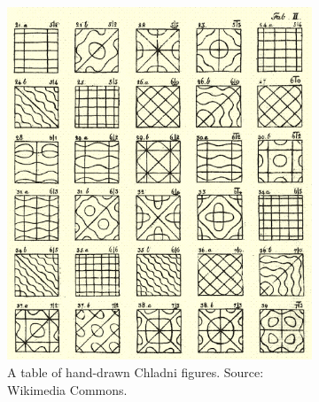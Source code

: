\documentclass[11pt]{article}
\begin{document}
\begin{figure}
\centering
	\begin{subfigure}[h]{0.4\textwidth}
		\centering
		\includegraphics[width=\textwidth]{Figures/chladni_drawing.png}
		\caption{A table of hand-drawn Chladni figures. Source: Wikimedia Commons.}
		\label{fig:chladni-drawn}
	\end{subfigure}
	 \hspace{3em}
	\begin{subfigure}[h]{0.4\textwidth}
		\centering

\end{subfigure}
\end{figure}
\end{document}
